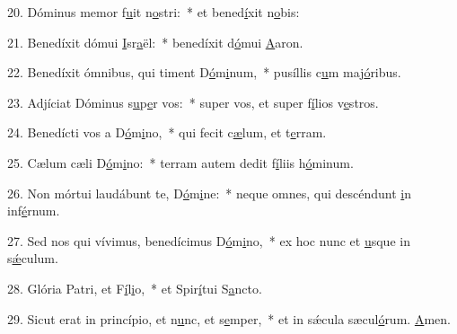 20. Dóminus memor f\uline{u}it n\uline{o}stri:~* et bened\uline{í}xit n\uline{o}bis:\par 
21. Benedíxit dómui \uline{I}sr\uline{a}ël:~* benedíxit d\uline{ó}mui \uline{A}aron.\par 
22. Benedíxit ómnibus, qui timent D\uline{ó}m\uline{i}num,~* pusíllis c\uline{u}m maj\uline{ó}ribus.\par 
23. Adjíciat Dóminus s\uline{u}p\uline{e}r vos:~* super vos, et super f\uline{í}lios v\uline{e}stros.\par 
24. Benedícti vos a D\uline{ó}m\uline{i}no,~* qui fecit c\uline{æ}lum, et t\uline{e}rram.\par 
25. Cælum cæli D\uline{ó}m\uline{i}no:~* terram autem dedit f\uline{í}liis h\uline{ó}minum.\par 
26. Non mórtui laudábunt te, D\uline{ó}m\uline{i}ne:~* neque omnes, qui descéndunt \uline{i}n inf\uline{é}rnum.\par 
27. Sed nos qui vívimus, benedícimus D\uline{ó}m\uline{i}no,~* ex hoc nunc et \uline{u}sque in s\uline{ǽ}culum.\par 
28. Glória Patri, et F\uline{í}l\uline{i}o,~* et Spir\uline{í}tui S\uline{a}ncto.\par 
29. Sicut erat in princípio, et n\uline{u}nc, et s\uline{e}mper,~* et in sǽcula sæcul\uline{ó}rum. \uline{A}men.\par 
